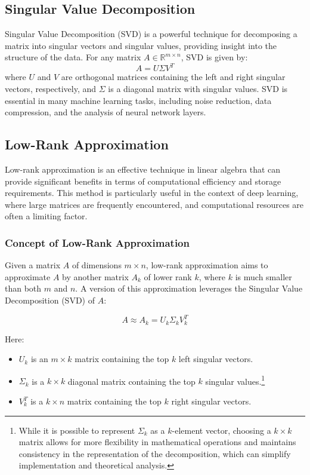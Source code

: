 \subsection{Singular Value Decomposition}
    Singular Value Decomposition (SVD) is a powerful technique for decomposing a matrix into singular vectors and singular values, providing insight into the structure of the data. For any matrix $A \in \mathbb{R}^{m \times n}$, SVD is given by:
    \begin{equation}
        A = U\Sigma V^T
        \label{eq:svd}
    \end{equation}
    where $U$ and $V$ are orthogonal matrices containing the left and right singular vectors, respectively, and $\Sigma$ is a diagonal matrix with singular values. SVD is essential in many machine learning tasks, including noise reduction, data compression, and the analysis of neural network layers.

\subsection{Low-Rank Approximation}

    Low-rank approximation is an effective technique in linear algebra that can provide significant benefits in terms of computational efficiency and storage requirements. This method is particularly useful in the context of deep learning, where large matrices are frequently encountered, and computational resources are often a limiting factor.
    
    \subsubsection{Concept of Low-Rank Approximation}
    
    Given a matrix $A$ of dimensions $m \times n$, low-rank approximation aims to approximate $A$ by another matrix $A_k$ of lower rank $k$, where $k$ is much smaller than both $m$ and $n$. A version of this approximation leverages the Singular Value Decomposition (SVD) of $A$:
    
    \[
    A \approx A_k = U_k \Sigma_k V_k^T
    \]
    
    Here:
    \begin{itemize}
        \item $U_k$ is an $m \times k$ matrix containing the top $k$ left singular vectors.
        \item $\Sigma_k$ is a $k \times k$ diagonal matrix containing the top $k$ singular values.\footnote{While it is possible to represent $\Sigma_k$ as a $k$-element vector, choosing a $k \times k$ matrix allows for more flexibility in mathematical operations and maintains consistency in the representation of the decomposition, which can simplify implementation and theoretical analysis.}
        \item $V_k^T$ is a $k \times n$ matrix containing the top $k$ right singular vectors.
    \end{itemize}
    
